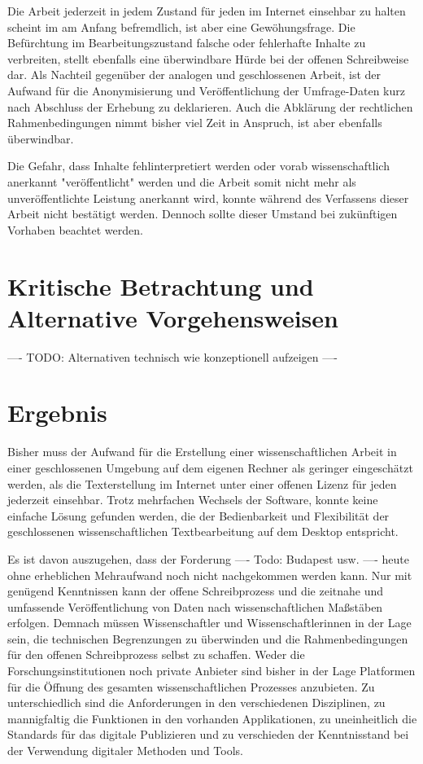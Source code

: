 Die Arbeit jederzeit in jedem Zustand für jeden im Internet einsehbar zu halten scheint im am Anfang befremdlich, ist aber eine Gewöhungsfrage. Die Befürchtung im Bearbeitungszustand falsche oder fehlerhafte Inhalte zu verbreiten, stellt ebenfalls eine überwindbare Hürde bei der offenen Schreibweise dar. Als Nachteil gegenüber der analogen und geschlossenen Arbeit, ist der Aufwand für die Anonymisierung und Veröffentlichung der Umfrage-Daten kurz nach Abschluss der Erhebung zu deklarieren. Auch die Abklärung der rechtlichen Rahmenbedingungen nimmt bisher viel Zeit in Anspruch, ist aber ebenfalls überwindbar.

Die Gefahr, dass Inhalte fehlinterpretiert werden oder vorab wissenschaftlich anerkannt "veröffentlicht" werden und die Arbeit somit nicht mehr als unveröffentlichte Leistung anerkannt wird, konnte während des Verfassens dieser Arbeit nicht bestätigt werden. Dennoch sollte dieser Umstand bei zukünftigen Vorhaben beachtet werden.

\section{Kritische Betrachtung und Alternative Vorgehensweisen}

---- TODO: Alternativen technisch wie konzeptionell aufzeigen ----

\section{Ergebnis}

Bisher muss der Aufwand für die Erstellung einer wissenschaftlichen Arbeit in einer geschlossenen Umgebung auf dem eigenen Rechner als geringer eingeschätzt werden, als die Texterstellung im Internet unter einer offenen Lizenz für jeden jederzeit einsehbar. Trotz mehrfachen Wechsels der Software, konnte keine einfache Lösung gefunden werden, die der Bedienbarkeit und Flexibilität der geschlossenen wissenschaftlichen Textbearbeitung auf dem Desktop entspricht.

Es ist davon auszugehen, dass der Forderung ---- Todo: Budapest usw. ---- heute ohne erheblichen Mehraufwand noch nicht nachgekommen werden kann. Nur mit genügend Kenntnissen kann der offene Schreibprozess und die zeitnahe und umfassende Veröffentlichung von Daten nach wissenschaftlichen Maßstäben erfolgen. Demnach müssen Wissenschaftler und Wissenschaftlerinnen in der Lage sein, die technischen Begrenzungen zu überwinden und die Rahmenbedingungen für den offenen Schreibprozess selbst zu schaffen. Weder die Forschungsinstitutionen noch private Anbieter sind bisher in der Lage Platformen für die Öffnung des gesamten wissenschaftlichen Prozesses anzubieten. Zu unterschiedlich sind die Anforderungen in den verschiedenen Disziplinen, zu mannigfaltig die Funktionen in den vorhanden Applikationen, zu uneinheitlich die Standards für das digitale Publizieren und zu verschieden der Kenntnisstand bei der Verwendung digitaler Methoden und Tools.

